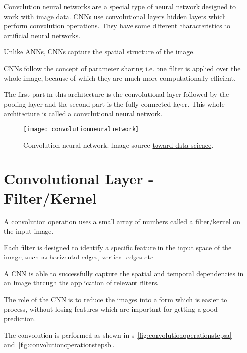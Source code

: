 Convolution neural networks are a special type of neural network designed to work with image data.  CNNs use convolutional layers hidden layers which perform convolution operations. They have some different characteristics to artificial neural networks.
	\begin{bulletedlist}
		\item Unlike ANNs, CNNs capture the spatial structure of the image.
		\item CNNs follow the concept of parameter sharing i.e. one filter is applied over the whole image, because of which they are much more computationally efficient.
		\item The first part in this architecture is the convolutional layer followed by the pooling layer and the second part is the fully connected layer.  This whole architecture is called a convolutional neural network.
	\end{bulletedlist}

	\begin{figure}[h]
		\centering
		\texttt{[image: convolutionneuralnetwork]}
		\caption[Convolution neural network]{Convolution neural network.  Image source \href{https://towardsdatascience.com/a-comprehensive-guide-to-convolutional-neural-networks-the-eli5-way-3bd2b1164a53}{toward data science}.}
		\label{fig:convolutionneuralnetwork}
	\end{figure}

	\section{Convolutional Layer - Filter/Kernel}
	\begin{bulletedlist}
		\item A convolution operation uses a small array of numbers called a filter/kernel on the input image.
		\item Each filter is designed to identify a specific feature in the input space of the image, such as horizontal edges, vertical edges etc.
		\item A CNN is able to successfully capture the spatial and temporal dependencies in an image through the application of relevant filters.
		\item The role of the CNN is to reduce the images into a form which is easier to process, without losing features which are important for getting a good prediction.
		\item The convolution is performed as shown in \figurename{}s~\ref{fig:convolutionoperationstepsa} and~\ref{fig:convolutionoperationstepsb}.
	\end{bulletedlist}


